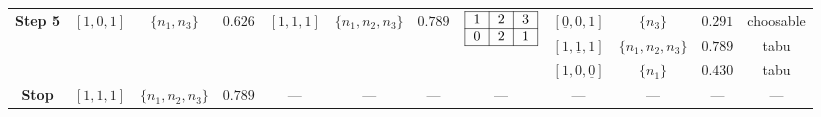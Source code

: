 \begin{table}[hbt]
{\begin{tabular}{|c|c|c|c|c|c|c|c|c|c|c|c|}
    \hline
    \multicolumn{1}{|c|}{\multirow{3}{*}{\textbf{Step 5}}}
    &\multicolumn{1}{c|}{\multirow{3}{*}{$[1,0,1]$}}
    &\multicolumn{1}{c|}{\multirow{3}{*}{$\{n_1,n_3\}$}}
    &\multicolumn{1}{c|}{\multirow{3}{*}{$0.626$}}
    &\multicolumn{1}{c|}{\multirow{3}{*}{$[1,1,1]$}}
    &\multicolumn{1}{c|}{\multirow{3}{*}{$\{n_1,n_2,n_3\}$}}
    &\multicolumn{1}{c|}{\multirow{3}{*}{$0.789$}}
    &\multicolumn{1}{c|}{\multirow{3}{*}{$
                                                     \begin{tabular}{|c|c|c|}
                                                        \hline
                                                        1 & 2 & 3 \\
                                                        \hline
                                                        0 & 2 & 1 \\
                                                        \hline
                                                     \end{tabular}$}}
    &$[\underline{0},0,1]$ &$\{n_3\}$ & $0.291$ & choosable
    \\
    
    \multicolumn{1}{|c|}{}
    &\multicolumn{1}{c|}{}
    &\multicolumn{1}{c|}{}
    &\multicolumn{1}{c|}{}
    &\multicolumn{1}{c|}{}
    &\multicolumn{1}{c|}{}
    &\multicolumn{1}{c|}{}
    &\multicolumn{1}{c|}{}
    &$[1,\underline{1},1]$ & $\{n_1,n_2,n_3\}$ & $0.789$ & tabu
    \\
    
    \multicolumn{1}{|c|}{}
    &\multicolumn{1}{c|}{}
    &\multicolumn{1}{c|}{}
    &\multicolumn{1}{c|}{}
    &\multicolumn{1}{c|}{}
    &\multicolumn{1}{c|}{}
    &\multicolumn{1}{c|}{}
    &\multicolumn{1}{c|}{}
    &$[1,0,\underline{0}]$ & $\{n_1\}$ & $0.430$ & tabu
    \\
    
    \hline
    \multicolumn{1}{|c|}{\multirow{3}{*}{\textbf{Stop}}}
    &\multicolumn{1}{c|}{\multirow{3}{*}{$[1,1,1]$}}
    &\multicolumn{1}{c|}{\multirow{3}{*}{$\{n_1,n_2,n_3\}$}}
    &\multicolumn{1}{c|}{\multirow{3}{*}{$0.789$}}
    &\multicolumn{1}{c|}{\multirow{3}{*}{---}}
    &\multicolumn{1}{c|}{\multirow{3}{*}{---}}
    &\multicolumn{1}{c|}{\multirow{3}{*}{---}}
    &\multicolumn{1}{c|}{\multirow{3}{*}{---}}
    &\multicolumn{1}{c|}{\multirow{3}{*}{---}} 
    &\multicolumn{1}{c|}{\multirow{3}{*}{---}} 
    &\multicolumn{1}{c|}{\multirow{3}{*}{---}}  
    &\multicolumn{1}{c|}{\multirow{3}{*}{---}}
    \\
    

\end{tabular}}
\end{table}
